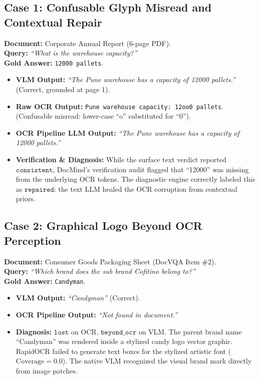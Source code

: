 \documentclass[conference]{IEEEtran}
\begin{document}
{\subsection{Case 1: Confusable Glyph Misread and Contextual Repair}
\textbf{Document:} Corporate Annual Report (6-page PDF). \\
\textbf{Query:} \textit{``What is the warehouse capacity?''} \\
\textbf{Gold Answer:} \texttt{12000 pallets}.
\begin{itemize}
    \item \textbf{VLM Output:} \textit{``The Pune warehouse has a capacity of 12000 pallets.''} (Correct, grounded at page 1).
    \item \textbf{Raw OCR Output:} \texttt{Pune warehouse capacity: 12oo0 pallets}. (Confusable misread: lower-case ``o'' substituted for ``0'').
    \item \textbf{OCR Pipeline LLM Output:} \textit{``The Pune warehouse has a capacity of 12000 pallets.''}
    \item \textbf{Verification \& Diagnosis:} While the surface text verdict reported $\texttt{consistent}$, DocMind's verification audit flagged that ``12000'' was missing from the underlying OCR tokens. The diagnostic engine correctly labeled this as $\texttt{repaired}$: the text LLM healed the OCR corruption from contextual priors.
\end{itemize}

\subsection{Case 2: Graphical Logo Beyond OCR Perception}
\textbf{Document:} Consumer Goods Packaging Sheet (DocVQA Item \#2). \\
\textbf{Query:} \textit{``Which brand does the sub brand Cofitino belong to?''} \\
\textbf{Gold Answer:} \texttt{Candyman}.
\begin{itemize}
    \item \textbf{VLM Output:} \textit{``Candyman''} (Correct).
    \item \textbf{OCR Pipeline Output:} \textit{``Not found in document.''}
    \item \textbf{Diagnosis:} $\texttt{lost}$ on OCR, $\texttt{beyond\_ocr}$ on VLM. The parent brand name ``Candyman'' was rendered inside a stylized candy logo vector graphic. RapidOCR failed to generate text boxes for the stylized artistic font ($\text{Coverage} = 0.0$). The native VLM recognized the visual brand mark directly from image patches.
\end{itemize}

}
\end{document}
